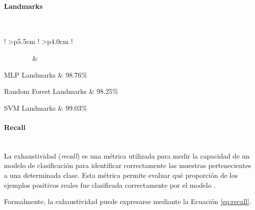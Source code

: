 	\paragraph{Landmarks}\mbox{}\\
	
	{
		
		\small
		\renewcommand{\arraystretch}{1.15}
		
		\begin{table}[H]
			\centering
			\caption{Comparación de precisión (\textit{precision}) obtenida por los modelos evaluados utilizando landmarks extraídos mediante MediaPipe Hands.}
			\label{tab:landmarks_precision}
			
			\begin{tabular}{
					!{\vrule width 0.6pt}
					>{\centering\arraybackslash}p{5.5cm}
					!{\vrule width 0.6pt}
					>{\centering\arraybackslash}p{4.0cm}
					!{\vrule width 0.6pt}
				}
				\hline
				
				\textcolor{white}{\textbf{Modelo}} &
				\textcolor{white}{\textbf{Precision}} \\
				
				\hline
				
				MLP Landmarks &
				98.76\% \\
				\hline
				
				Random Forest Landmarks &
				98.25\% \\
				\hline
				
				SVM Landmarks &
				99.03\% \\
				\hline
				
			\end{tabular}
		\end{table}
	}
	
	
	\paragraph{Recall}\mbox{}\\
	
	La exhaustividad (\textit{recall}) es una métrica utilizada para medir la capacidad de un modelo de clasificación para identificar correctamente las muestras pertenecientes a una determinada clase. Esta métrica permite evaluar qué proporción de los ejemplos positivos reales fue clasificada correctamente por el modelo \cite{goodfellow2016deep,geron2022hands}.
	
	Formalmente, la exhaustividad puede expresarse mediante la Ecuación \ref{eq:recall}.
	
